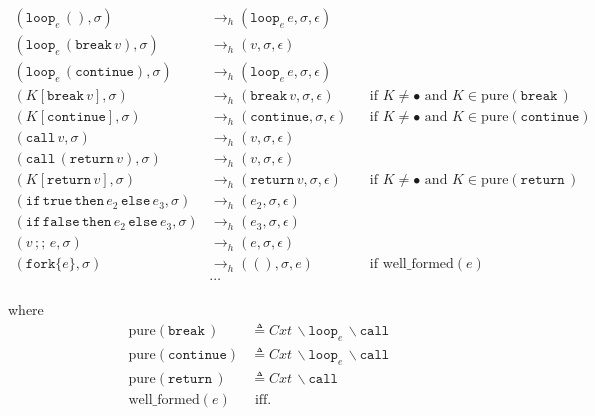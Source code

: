 \documentclass{article}
\numberwithin{algorithm}{section}
\newcommand{\true}{\texttt{true}}
\newcommand{\false}{\texttt{false}}
\newcommand{\cfork}[1]{\texttt{fork}\{#1\}}
\newcommand{\cloop}[1]{\texttt{loop}_{#1}\,}
\newcommand{\cbreak}{\texttt{break}\,}
\newcommand{\ccontinue}{\texttt{continue}}
\newcommand{\cif}{\texttt{if}\,}
\newcommand{\cthen}{\,\texttt{then}\,}
\newcommand{\celse}{\,\texttt{else}\,}
\newcommand{\cseq}{\,;;\,}
\newcommand{\creturn}{\texttt{return}\,}
\newcommand{\ccall}{\texttt{call}\,}
\newcommand{\pure}[1]{\text{pure}(#1)}
\newcommand{\wellf}[1]{\text{well\_formed}(#1)}
\newcommand{\hred}{\rightarrow_h}
\newcommand{\sep}{\,|\,}
\begin{document}
$$
\begin{aligned}
    (\cloop{e} (), \sigma) &\hred (\cloop{e} e, \sigma, \epsilon) && \\
    (\cloop{e} (\cbreak v), \sigma) &\hred (v, \sigma, \epsilon) && \\
    (\cloop{e} (\ccontinue), \sigma) &\hred (\cloop{e} e, \sigma, \epsilon) &&  \\
    (K[\cbreak v], \sigma) &\hred (\cbreak v, \sigma, \epsilon) && \text{if } K \neq \bullet \text{ and } K \in \pure{\cbreak\!} \\
    (K[\ccontinue], \sigma) &\hred (\ccontinue, \sigma, \epsilon) && \text{if } K \neq \bullet \text{ and } K \in \pure{\ccontinue} \\
    (\ccall v, \sigma) &\hred (v, \sigma, \epsilon) \\
    (\ccall (\creturn v), \sigma) &\hred (v, \sigma, \epsilon) \\
    (K[\creturn v], \sigma) &\hred (\creturn v, \sigma, \epsilon) && \text{if } K \neq \bullet \text{ and } K \in \pure{\creturn\!} \\
    (\cif \true \cthen e_2 \celse e_3, \sigma) &\hred (e_2, \sigma, \epsilon) && \\
    (\cif \false \cthen e_2 \celse e_3, \sigma) &\hred (e_3, \sigma, \epsilon) && \\
    (v \cseq e, \sigma) &\hred (e, \sigma, \epsilon) && \\
    (\cfork{e}, \sigma) &\hred ((), \sigma, e) && \text{if } \wellf{e} \\
    &\cdots
\end{aligned}
$$

where
$$
\begin{aligned}
    \pure{\cbreak\!} &\triangleq \textit{Cxt}\,\backslash\cloop{e}\backslash\ccall \\
    \pure{\ccontinue} &\triangleq \textit{Cxt}\,\backslash\cloop{e}\backslash\ccall \\
    \pure{\creturn\!} &\triangleq \textit{Cxt}\,\backslash\ccall \\
    \wellf{e} &\text{ iff. } %
    \end{aligned}
$$
\end{document}
